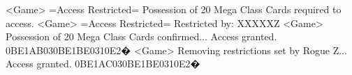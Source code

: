 <Game> =Access Restricted= 
Possession of 20 Mega Class Cards required to access. 
<Game> =Access Restricted= Restricted by: XXXXXZ 
<Game> Possession of 20 Mega Class Cards confirmed... Access granted. 
{0B}{E1}{AB}{03}{0B}{E1}{BE}{03}{10}{E2}�
<Game> Removing restrictions set by Rogue Z... Access granted. 
{0B}{E1}{AC}{03}{0B}{E1}{BE}{03}{10}{E2}�

